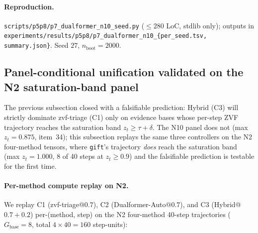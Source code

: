 \documentclass{article}
\begin{document}
\paragraph{Reproduction.}
\texttt{scripts/p5p8/p7\_dualformer\_n10\_seed.py} ($\leq 280$ LoC,
stdlib only); outputs in
\texttt{experiments/results/p5p8/p7\_dualformer\_n10\_\{per\_seed.tsv,
summary.json\}}. Seed $27$, $n_{\mathrm{boot}}{=}2000$.

\subsection{Panel-conditional unification validated on the N2
saturation-band panel}
\label{sec:p7-controller-hybrid-n2}

The previous subsection closed with a falsifiable prediction: Hybrid (C3)
will strictly dominate zvf-triage (C1) only on evidence bases whose
per-step ZVF trajectory reaches the saturation band $z_t \geq \tau + \delta$.
The N10 panel does not (max $z_t = 0.875$, item~34); this subsection
replays the same three controllers on the N2 four-method tensors, where
\texttt{gift}'s trajectory \emph{does} reach the saturation band (max
$z_t = 1.000$, 8 of 40 steps at $z_t \geq 0.9$) and the falsifiable
prediction is testable for the first time.

\paragraph{Per-method compute replay on N2.}
We replay C1 (zvf-triage@$0.7$), C2 (Dualformer-Auto@$0.7$), and
C3 (Hybrid@$0.7{+}0.2$) per-(method, step) on the N2 four-method
40-step trajectories ($G_{\mathrm{base}}{=}8$, total $4 \times 40 = 160$
step-units):
\end{document}
